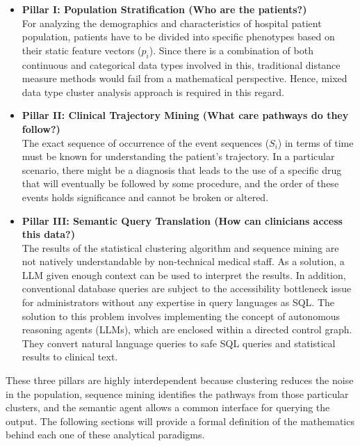 \begin{itemize}
    \item \textbf{Pillar I: Population Stratification (Who are the patients?)} \\
    For analyzing the demographics and characteristics of hospital patient population, patients have to be divided into specific phenotypes based on their static feature vectors ($p_i$). Since there is a combination of both continuous and categorical data types involved in this, traditional distance measure methods would fail from a mathematical perspective. Hence, mixed data type cluster analysis approach is required in this regard.

    \vspace{0.5em}

    \item \textbf{Pillar II: Clinical Trajectory Mining (What care pathways do they follow?)} \\
    The exact sequence of occurrence of the event sequences ($S_i$) in terms of time must be known for understanding the patient's trajectory. In a particular scenario, there might be a diagnosis that leads to the use of a specific drug that will eventually be followed by some procedure, and the order of these events holds significance and cannot be broken or altered.

    \vspace{0.5em}

    \item \textbf{Pillar III: Semantic Query Translation (How can clinicians access this data?)} \\
    The results of the statistical clustering algorithm and sequence mining are not natively understandable by non-technical medical staff. As a solution, a LLM given enough context can be used to interpret the results. In addition, conventional database queries are subject to the accessibility bottleneck issue for administrators without any expertise in query languages as SQL. The solution to this problem involves implementing the concept of autonomous reasoning agents (LLMs), which are enclosed within a directed control graph. They convert natural language queries to safe SQL queries and statistical results to clinical text.
\end{itemize}

\vspace{1em}

These three pillars are highly interdependent because clustering reduces the noise in the population, sequence mining identifies the pathways from those particular clusters, and the semantic agent allows a common interface for querying the output. The following sections will provide a formal definition of the mathematics behind each one of these analytical paradigms.
